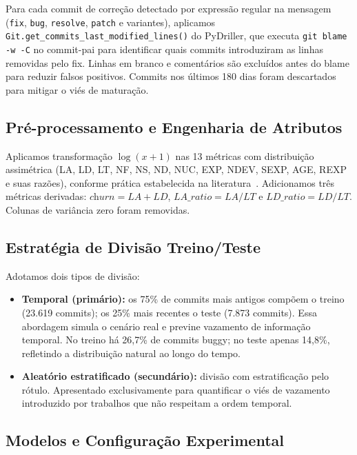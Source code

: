 \documentclass[12pt]{article}
\begin{document}
Para cada commit de correção detectado por expressão regular na mensagem
(\texttt{fix}, \texttt{bug}, \texttt{resolve}, \texttt{patch} e variantes),
aplicamos \texttt{Git.get\_commits\_last\_modified\_lines()} do PyDriller, que
executa \texttt{git blame -w -C} no commit-pai para identificar quais commits
introduziram as linhas removidas pelo fix. Linhas em branco e comentários são
excluídos antes do blame para reduzir falsos positivos. Commits nos últimos
180 dias foram descartados para mitigar o viés de maturação.

\subsection{Pré-processamento e Engenharia de Atributos}

Aplicamos transformação $\log(x+1)$ nas 13 métricas com distribuição assimétrica
(LA, LD, LT, NF, NS, ND, NUC, EXP, NDEV, SEXP, AGE, REXP e suas razões),
conforme prática estabelecida na literatura~\cite{kamei2013}.
Adicionamos três métricas derivadas: $\textit{churn} = LA+LD$,
$LA\_ratio = LA/LT$ e $LD\_ratio = LD/LT$.
Colunas de variância zero foram removidas.

\subsection{Estratégia de Divisão Treino/Teste}

Adotamos dois tipos de divisão:
\begin{itemize}
  \item \textbf{Temporal (primário):} os 75\% de commits mais antigos compõem o treino
        (23.619 commits); os 25\% mais recentes o teste (7.873 commits). Essa abordagem
        simula o cenário real e previne vazamento de informação temporal. No treino há
        26,7\% de commits buggy; no teste apenas 14,8\%, refletindo a distribuição
        natural ao longo do tempo.
  \item \textbf{Aleatório estratificado (secundário):} divisão com estratificação
        pelo rótulo. Apresentado exclusivamente para quantificar o viés de vazamento
        introduzido por trabalhos que não respeitam a ordem temporal.
\end{itemize}

\subsection{Modelos e Configuração Experimental}
\end{document}

